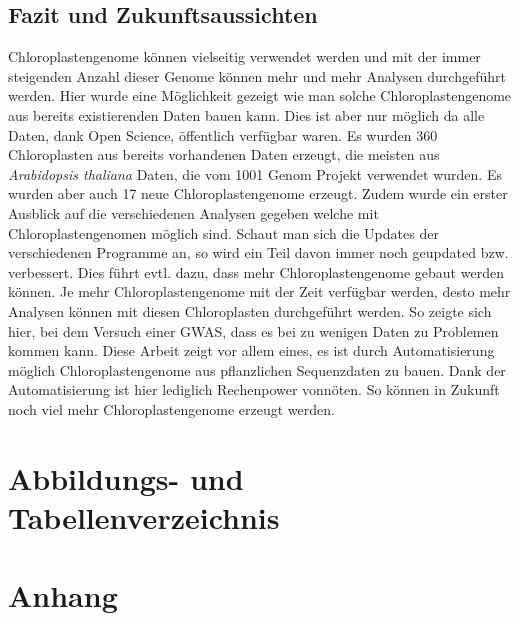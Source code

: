 \documentclass{scrartcl}
\begin{document}
\subsection{Fazit und Zukunftsaussichten}
\label{sec-5-8}
Chloroplastengenome können vielseitig verwendet werden und mit der immer steigenden Anzahl dieser Genome können mehr und mehr Analysen durchgeführt werden. Hier wurde eine Möglichkeit gezeigt wie man solche Chloroplastengenome
aus bereits existierenden Daten bauen kann. Dies ist aber nur möglich da alle Daten, dank Open Science, öffentlich verfügbar waren. Es wurden 360 Chloroplasten aus bereits vorhandenen Daten erzeugt, die meisten aus \emph{Arabidopsis thaliana}
Daten, die vom 1001 Genom Projekt verwendet wurden. Es wurden aber auch 17 neue Chloroplastengenome erzeugt. Zudem wurde ein erster Ausblick auf die verschiedenen Analysen gegeben welche mit Chloroplastengenomen möglich sind.
Schaut man sich die Updates der verschiedenen Programme an, so wird ein Teil davon immer noch geupdated bzw. verbessert. Dies führt evtl. dazu, dass mehr Chloroplastengenome gebaut werden können.  Je mehr Chloroplastengenome mit der Zeit verfügbar werden, desto 
mehr Analysen können mit diesen Chloroplasten durchgeführt werden. So zeigte sich hier, bei dem Versuch einer GWAS, dass es bei zu wenigen Daten zu Problemen kommen kann. 
Diese Arbeit zeigt vor allem eines, es ist durch Automatisierung möglich Chloroplastengenome aus pflanzlichen Sequenzdaten zu bauen. Dank der Automatisierung ist hier lediglich Rechenpower vonnöten. So können in Zukunft
noch viel mehr Chloroplastengenome erzeugt werden.
\section{Abbildungs- und Tabellenverzeichnis}
\label{sec-6}
\listoffigures

\listoftables
\clearpage
\section{Anhang}
\label{sec-7}
\end{document}
